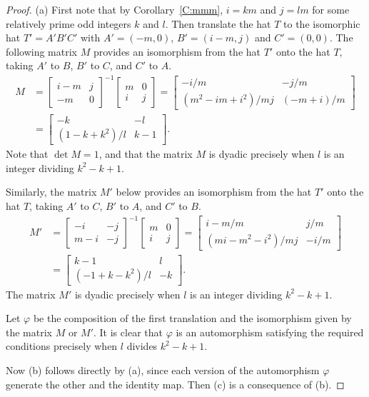 \documentclass[12pt]{amsart}
\def\p{\varphi}
\theoremstyle{plain}
\theoremstyle{definition}
\numberwithin{equation}{section}
\begin{document}
\begin{proof}
(a) First note that by Corollary~\ref{C:mmm}, $i = km$ and $j = lm$ for some relatively prime
odd integers $k$ and $l$. Then translate the hat $T$ to the isomorphic hat $T' = A'B'C'$ with
$A' = (-m,0)$, $B' = (i-m,j)$ and $C' = (0,0)$. The following matrix $M$ provides an
isomorphism from the hat $T'$ onto the hat $T$, taking $A'$ to $B$, $B'$ to $C$, and $C'$ to
$A$.
\begin{align*}
M &=
	\begin{bmatrix}
		i-m&j\\
		-m&0
	\end{bmatrix}^{-1}
	\begin{bmatrix}
		m&0\\
		i&j
	\end{bmatrix}
    =\begin{bmatrix}
	-i/m&-j/m\\
	(m^2-im+i^2)/mj&(-m+i)/m
    \end{bmatrix}\\
    &= \begin{bmatrix}
     -k&-l\\
	(1-k+k^2)/l&k-1
    \end{bmatrix}.
\end{align*}
Note that $\det M = 1$, and that the matrix $M$ is dyadic precisely when $l$ is an integer dividing
$k^2 - k + 1$.

Similarly, the matrix $M'$ below provides an isomorphism from the hat $T'$ onto the hat $T$,
taking $A'$ to $C$, $B'$ to $A$, and $C'$ to $B$.
\begin{align*}
M' &=
	\begin{bmatrix}
		-i&-j\\
		m-i&-j
	\end{bmatrix}^{-1}
	\begin{bmatrix}
		m&0\\
		i&j
	\end{bmatrix}
    =\begin{bmatrix}
	i-m/m&j/m\\
	(mi-m^2 -i^2)/mj&-i/m
    \end{bmatrix}\\
    &= \begin{bmatrix}
     k-1&l\\
	(-1+k-k^2)/l&-k
    \end{bmatrix}.
\end{align*}
The matrix $M'$ is dyadic precisely when $l$ is an integer dividing $k^2 - k + 1$.

Let $\p$ be the composition of the first translation and the isomorphism given by the matrix $M$ or $M'$. It is clear that $\p$ is an automorphism satisfying the required conditions precisely when $l$ divides $k^2 - k + 1$.

Now (b) follows directly by (a), since each version of the automorphism $\p$ generate the other and the identity map. Then (c) is a consequence of (b).
\end{proof}
\end{document}
